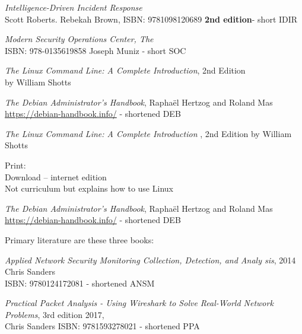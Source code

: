 \documentclass[Screen16to9,17pt]{foils}
\begin{document}
\emph{Intelligence-Driven Incident Response} \\
  Scott Roberts. Rebekah Brown, ISBN: 9781098120689 {\bf 2nd edition}- short IDIR





\emph{Modern Security Operations Center, The}\\
ISBN: 978-0135619858 Joseph Muniz - short SOC

\begin{list2}
\item \emph{The Linux Command Line: A Complete Introduction}, 2nd Edition\\
 by William Shotts
\item \emph{The Debian Administrator’s Handbook}, Raphaël Hertzog and Roland Mas\\
\url{https://debian-handbook.info/} - shortened DEB
\end{list2}



\emph{The Linux Command Line: A Complete Introduction }, 2nd Edition
by William Shotts

Print: \\
Download -- internet edition \\
Not curriculum but explains how to use Linux



\emph{The Debian Administrator’s Handbook}, Raphaël Hertzog and Roland Mas\\
\url{https://debian-handbook.info/} - shortened DEB


Primary literature are these three books:
\begin{list2}
\item \emph{Applied Network Security Monitoring Collection, Detection, and Analy
sis}, 2014 Chris Sanders \\
ISBN: 9780124172081 - shortened ANSM
\item \emph{Practical Packet Analysis - Using Wireshark to Solve Real-World Network Problems}, 3rd edition 2017, \\
Chris Sanders ISBN: 9781593278021 - shortened PPA
\end{list2}
\end{document}
